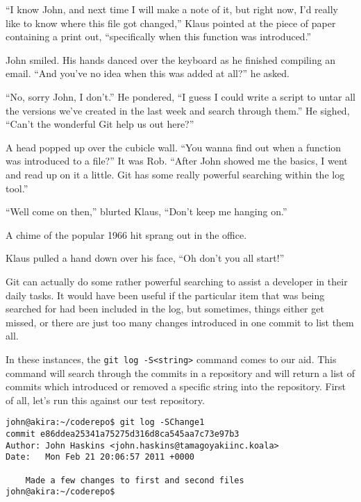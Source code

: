 \begin{trenches}
``I know John, and next time I will make a note of it, but right now, I'd really like to know where this file got changed,'' Klaus pointed at the piece of paper containing a print out, ``specifically when this function was introduced.''

John smiled.  His hands danced over the keyboard as he finished compiling an email.  ``And you've no idea when this was added at all?'' he asked.

``No, sorry John, I don't.''  He pondered, ``I guess I could write a script to untar all the versions we've created in the last week and search through them.''  He sighed, ``Can't the wonderful Git help us out here?''

A head popped up over the cubicle wall.  ``You wanna find out when a function was introduced to a file?''  It was Rob.  ``After John showed me the basics, I went and read up on it a little.  Git has some really powerful searching within the log tool.''

``Well come on then,'' blurted Klaus, ``Don't keep me hanging on.''

A chime of the popular 1966 hit sprang out in the office.

Klaus pulled a hand down over his face, ``Oh don't you all start!''
\end{trenches}

Git can actually do some rather powerful searching to assist a developer in their daily tasks.  It would have been useful if the particular item that was being searched for had been included in the log, but sometimes, things either get missed, or there are just too many changes introduced in one commit to list them all.

In these instances, the \texttt{git log -S<string>} command comes to our aid.  This command will search through the commits in a repository and will return a list of commits which introduced or removed a specific string into the repository.  First of all, let's run this against our test repository.

\begin{Verbatim}[frame=leftline,framerule=1mm,fontsize=\relsize{-3}] 
john@akira:~/coderepo$ git log -SChange1
commit e86ddea25341a75275d316d8ca545aa7c73e97b3
Author: John Haskins <john.haskins@tamagoyakiinc.koala>
Date:   Mon Feb 21 20:06:57 2011 +0000

    Made a few changes to first and second files
john@akira:~/coderepo$ 
\end{Verbatim}

